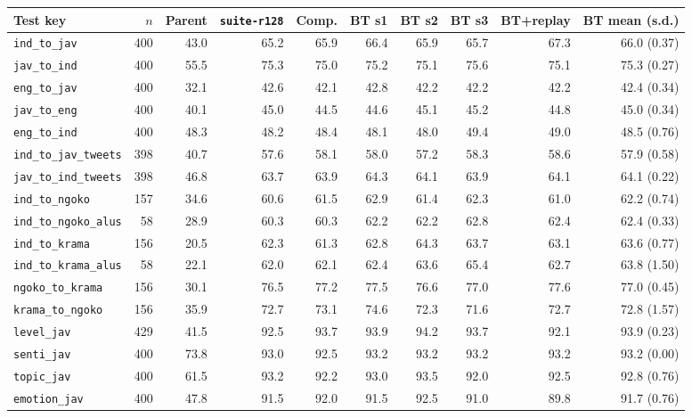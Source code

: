 \documentclass[11pt]{article}
\newcommand{\run}[1]{\texttt{#1}}
\begin{document}
\begin{table}[t]
\centering\footnotesize
\setlength{\tabcolsep}{3pt}
\begin{tabular}{lrrrrrrrrr}
\toprule
Test key & $n$ & Parent & \run{suite-r128} & Comp. & BT s1 & BT s2 & BT s3 & BT+replay & BT mean (s.d.) \\
\midrule
\texttt{ind\_to\_jav} & 400 & 43.0 & 65.2 & 65.9 & 66.4 & 65.9 & 65.7 & 67.3 & 66.0 (0.37) \\
\texttt{jav\_to\_ind} & 400 & 55.5 & 75.3 & 75.0 & 75.2 & 75.1 & 75.6 & 75.1 & 75.3 (0.27) \\
\texttt{eng\_to\_jav} & 400 & 32.1 & 42.6 & 42.1 & 42.8 & 42.2 & 42.2 & 42.2 & 42.4 (0.34) \\
\texttt{jav\_to\_eng} & 400 & 40.1 & 45.0 & 44.5 & 44.6 & 45.1 & 45.2 & 44.8 & 45.0 (0.34) \\
\texttt{eng\_to\_ind} & 400 & 48.3 & 48.2 & 48.4 & 48.1 & 48.0 & 49.4 & 49.0 & 48.5 (0.76) \\
\texttt{ind\_to\_jav\_tweets} & 398 & 40.7 & 57.6 & 58.1 & 58.0 & 57.2 & 58.3 & 58.6 & 57.9 (0.58) \\
\texttt{jav\_to\_ind\_tweets} & 398 & 46.8 & 63.7 & 63.9 & 64.3 & 64.1 & 63.9 & 64.1 & 64.1 (0.22) \\
\texttt{ind\_to\_ngoko} & 157 & 34.6 & 60.6 & 61.5 & 62.9 & 61.4 & 62.3 & 61.0 & 62.2 (0.74) \\
\texttt{ind\_to\_ngoko\_alus} & 58 & 28.9 & 60.3 & 60.3 & 62.2 & 62.2 & 62.8 & 62.4 & 62.4 (0.33) \\
\texttt{ind\_to\_krama} & 156 & 20.5 & 62.3 & 61.3 & 62.8 & 64.3 & 63.7 & 63.1 & 63.6 (0.77) \\
\texttt{ind\_to\_krama\_alus} & 58 & 22.1 & 62.0 & 62.1 & 62.4 & 63.6 & 65.4 & 62.7 & 63.8 (1.50) \\
\texttt{ngoko\_to\_krama} & 156 & 30.1 & 76.5 & 77.2 & 77.5 & 76.6 & 77.0 & 77.6 & 77.0 (0.45) \\
\texttt{krama\_to\_ngoko} & 156 & 35.9 & 72.7 & 73.1 & 74.6 & 72.3 & 71.6 & 72.7 & 72.8 (1.57) \\
\texttt{level\_jav} & 429 & 41.5 & 92.5 & 93.7 & 93.9 & 94.2 & 93.7 & 92.1 & 93.9 (0.23) \\
\texttt{senti\_jav} & 400 & 73.8 & 93.0 & 92.5 & 93.2 & 93.2 & 93.2 & 93.2 & 93.2 (0.00) \\
\texttt{topic\_jav} & 400 & 61.5 & 93.2 & 92.2 & 93.0 & 93.5 & 92.0 & 92.5 & 92.8 (0.76) \\
\texttt{emotion\_jav} & 400 & 47.8 & 91.5 & 92.0 & 91.5 & 92.5 & 91.0 & 89.8 & 91.7 (0.76) \\

\end{tabular}
\end{table}
\end{document}
